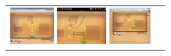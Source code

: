 \documentclass{acm_proc_article-sp}
\newcommand{\thumbheight}{14mm}
\newcommand{\newstrip}{\newline\vspace{-1em}\newline}
\newenvironment{thumbsequence}{}{\makebox[4mm]{}}
\begin{document}
\begin{figure}
\begin{tabular}{p{}p{}}
	\newstrip
	\begin{thumbsequence}
		\includegraphics[height=\thumbheight]{resources/ropes/looseduplicate1.jpg}
		\includegraphics[height=\thumbheight]{resources/ropes/looseduplicate2.jpg}
		\includegraphics[height=\thumbheight]{resources/ropes/looseduplicate3.png}

\end{thumbsequence}
\end{tabular}
\end{figure}
\end{document}

